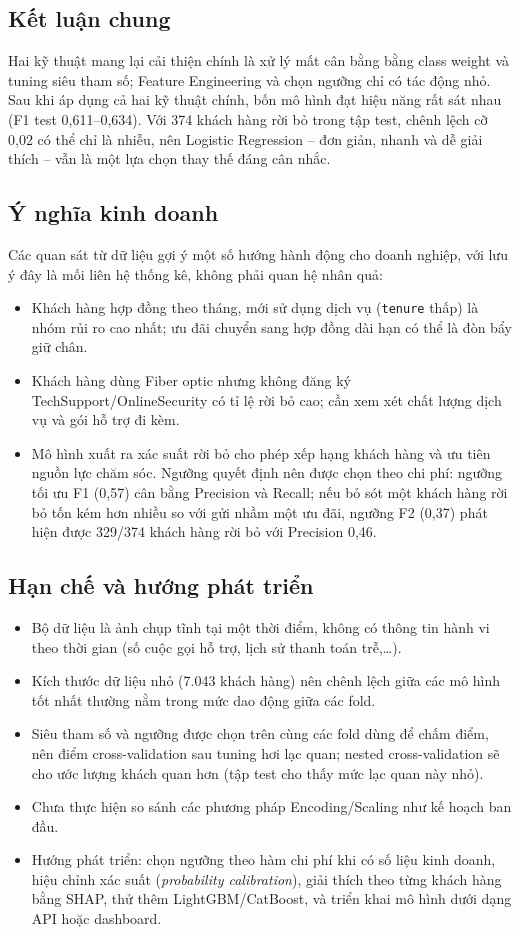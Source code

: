 \subsection{Kết luận chung}
Hai kỹ thuật mang lại cải thiện chính là xử lý mất cân bằng bằng class weight và tuning siêu tham số; Feature Engineering và chọn ngưỡng chỉ có tác động nhỏ. Sau khi áp dụng cả hai kỹ thuật chính, bốn mô hình đạt hiệu năng rất sát nhau (F1 test 0,611--0,634). Với 374 khách hàng rời bỏ trong tập test, chênh lệch cỡ 0,02 có thể chỉ là nhiễu, nên Logistic Regression -- đơn giản, nhanh và dễ giải thích -- vẫn là một lựa chọn thay thế đáng cân nhắc.

\subsection{Ý nghĩa kinh doanh}
Các quan sát từ dữ liệu gợi ý một số hướng hành động cho doanh nghiệp, với lưu ý đây là mối liên hệ thống kê, không phải quan hệ nhân quả:
\begin{itemize}
    \item Khách hàng hợp đồng theo tháng, mới sử dụng dịch vụ (\texttt{tenure} thấp) là nhóm rủi ro cao nhất; ưu đãi chuyển sang hợp đồng dài hạn có thể là đòn bẩy giữ chân.
    \item Khách hàng dùng Fiber optic nhưng không đăng ký TechSupport/OnlineSecurity có tỉ lệ rời bỏ cao; cần xem xét chất lượng dịch vụ và gói hỗ trợ đi kèm.
    \item Mô hình xuất ra xác suất rời bỏ cho phép xếp hạng khách hàng và ưu tiên nguồn lực chăm sóc. Ngưỡng quyết định nên được chọn theo chi phí: ngưỡng tối ưu F1 (0,57) cân bằng Precision và Recall; nếu bỏ sót một khách hàng rời bỏ tốn kém hơn nhiều so với gửi nhầm một ưu đãi, ngưỡng F2 (0,37) phát hiện được 329/374 khách hàng rời bỏ với Precision 0,46.
\end{itemize}

\subsection{Hạn chế và hướng phát triển}
\begin{itemize}
    \item Bộ dữ liệu là ảnh chụp tĩnh tại một thời điểm, không có thông tin hành vi theo thời gian (số cuộc gọi hỗ trợ, lịch sử thanh toán trễ,\ldots).
    \item Kích thước dữ liệu nhỏ (7.043 khách hàng) nên chênh lệch giữa các mô hình tốt nhất thường nằm trong mức dao động giữa các fold.
    \item Siêu tham số và ngưỡng được chọn trên cùng các fold dùng để chấm điểm, nên điểm cross-validation sau tuning hơi lạc quan; nested cross-validation sẽ cho ước lượng khách quan hơn (tập test cho thấy mức lạc quan này nhỏ).
    \item Chưa thực hiện so sánh các phương pháp Encoding/Scaling như kế hoạch ban đầu.
    \item Hướng phát triển: chọn ngưỡng theo hàm chi phí khi có số liệu kinh doanh, hiệu chỉnh xác suất (\textit{probability calibration}), giải thích theo từng khách hàng bằng SHAP, thử thêm LightGBM/CatBoost, và triển khai mô hình dưới dạng API hoặc dashboard.
\end{itemize}
